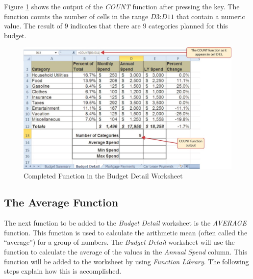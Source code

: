Figure \ref{02:fig18} shows the output of the \textit{COUNT} function after pressing the  key. The function counts the number of cells in the range $ D3 $:$ D11 $ that contain a numeric value. The result of $ 9 $ indicates that there are $ 9 $ categories planned for this budget.

\begin{figure}[H]
	\centering
	\includegraphics[width=\maxwidth{.95\linewidth}]{gfx/ch02_fig18}
	\caption{Completed  Function in the Budget Detail Worksheet}
	\label{02:fig18}
\end{figure}

\subsection{The Average Function}

The next function to be added to the \textit{Budget Detail} worksheet is the \textit{AVERAGE} function. This function is used to calculate the arithmetic mean (often called the ``average'') for a group of numbers. The \textit{Budget Detail} worksheet will use the function to calculate the average of the values in the \textit{Annual Spend} column. This function will be added to the worksheet by using \textit{Function Library}. The following steps explain how this is accomplished.

